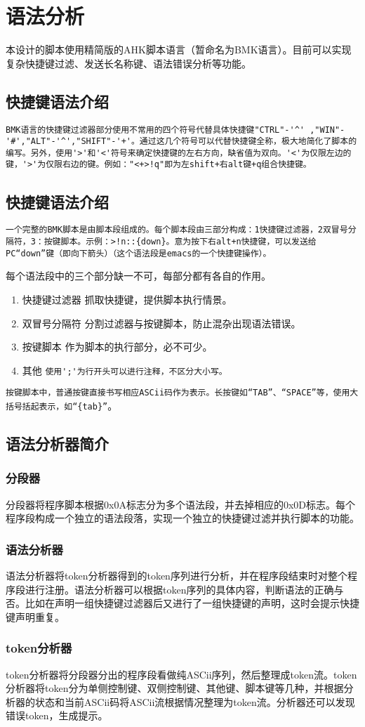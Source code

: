 \section{语法分析}
本设计的脚本使用精简版的AHK脚本语言（暂命名为BMK语言）。目前可以实现复杂快捷键过滤、发送长名称键、语法错误分析等功能。
\subsection{快捷键语法介绍}
\verb|BMK语言的快捷键过滤器部分使用不常用的四个符号代替具体快捷键"CTRL"-'^' ,"WIN"-'#',"ALT"-'^',"SHIFT"-'+'。通过这几个符号可以代替快捷键全称，极大地简化了脚本的编写。另外，使用'>'和'<'符号来确定快捷键的左右方向，缺省值为双向。'<'为仅限左边的键，'>'为仅限右边的键。例如："<+>!q"即为左shift+右alt键+q组合快捷键。|

\subsection{快捷键语法介绍}
\verb|一个完整的BMK脚本是由脚本段组成的。每个脚本段由三部分构成：1快捷键过滤器，2双冒号分隔符，3：按键脚本。示例：>!n::{down}。意为按下右alt+n快捷键，可以发送给PC“down”键（即向下箭头）（这个语法段是emacs的一个快捷键操作）。|

每个语法段中的三个部分缺一不可，每部分都有各自的作用。
\begin{enumerate}
\item 快捷键过滤器
抓取快捷键，提供脚本执行情景。

\item 双冒号分隔符
分割过滤器与按键脚本，防止混杂出现语法错误。

\item 按键脚本
作为脚本的执行部分，必不可少。

\item 其他
\verb|使用';'为行开头可以进行注释，不区分大小写。|
\end{enumerate}
\verb|按键脚本中，普通按键直接书写相应ASCii码作为表示。长按键如“TAB”、“SPACE”等，使用大括号括起表示，如“{tab}”|。
\subsection{语法分析器简介}
\subsubsection{分段器}
分段器将程序脚本根据0x0A标志分为多个语法段，并去掉相应的0x0D标志。每个程序段构成一个独立的语法段落，实现一个独立的快捷键过滤并执行脚本的功能。
\subsubsection{语法分析器}
语法分析器将token分析器得到的token序列进行分析，并在程序段结束时对整个程序段进行注册。语法分析器可以根据token序列的具体内容，判断语法的正确与否。比如在声明一组快捷键过滤器后又进行了一组快捷键的声明，这时会提示快捷键声明重复。
\subsubsection{token分析器}
token分析器将分段器分出的程序段看做纯ASCii序列，然后整理成token流。token分析器将token分为单侧控制键、双侧控制键、其他键、脚本键等几种，并根据分析器的状态和当前ASCii码将ASCii流根据情况整理为token流。分析器还可以发现错误token，生成提示。







